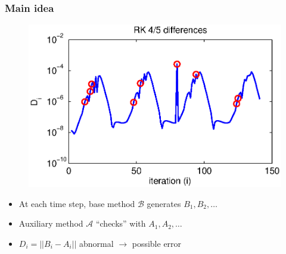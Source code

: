 \documentclass{beamer}
\newcommand{\A}{\mathcal{A}}
\newcommand{\B}{\mathcal{B}}
\begin{document}
%
\begin{frame}
\frametitle{Main idea}

\begin{figure}
  \centering
  \includegraphics[scale=0.5]{figs/vdp2_rk.eps}
\end{figure}

\begin{itemize}
\setlength{\itemsep}{0.05in}
\item{At each time step, base method $\B$ generates $B_1, B_2, \ldots$}
\pause
\item{Auxiliary method $\A$ ``checks'' with $A_1, A_2, \ldots$}
\pause
\item{$D_i = ||B_i - A_i||$ abnormal $\to$ possible error}
\end{itemize}
\end{frame}
\end{document}
